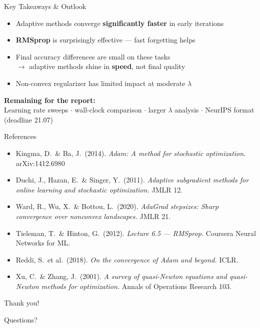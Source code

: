 \documentclass[aspectratio=169, 12pt]{beamer}
\begin{document}
\begin{frame}{Key Takeaways \& Outlook}
\begin{itemize}
  \setlength{\itemsep}{0.4cm}
  \item Adaptive methods converge \textbf{significantly faster} in early iterations
  \item \textbf{RMSprop} is surprisingly effective --- fast forgetting helps
  \item Final accuracy differences are small on these tasks\\
        $\to$ adaptive methods shine in \textbf{speed}, not final quality
  \item Non-convex regularizer has limited impact at moderate $\lambda$
\end{itemize}
\vskip0.3cm
\textbf{Remaining for the report:}\\
{\small Learning rate sweeps $\cdot$ wall-clock comparison $\cdot$ larger $\lambda$ analysis $\cdot$ NeurIPS format (deadline 21.07)}
\end{frame}

\begin{frame}{References}
\small
\begin{itemize}
  \setlength{\itemsep}{0.25cm}
  \item Kingma, D.\ \& Ba, J.\ (2014). \textit{Adam: A method for stochastic optimization.} arXiv:1412.6980
  \item Duchi, J., Hazan, E.\ \& Singer, Y.\ (2011). \textit{Adaptive subgradient methods for online learning and stochastic optimization.} JMLR 12.
  \item Ward, R., Wu, X.\ \& Bottou, L.\ (2020). \textit{AdaGrad stepsizes: Sharp convergence over nonconvex landscapes.} JMLR 21.
  \item Tieleman, T.\ \& Hinton, G.\ (2012). \textit{Lecture 6.5 --- RMSprop.} Coursera Neural Networks for ML.
  \item Reddi, S.\ et al.\ (2018). \textit{On the convergence of Adam and beyond.} ICLR.
  \item Xu, C.\ \& Zhang, J.\ (2001). \textit{A survey of quasi-Newton equations and quasi-Newton methods for optimization.} Annals of Operations Research 103.
\end{itemize}
\end{frame}

{
\begin{frame}[plain,c]
  \centering
  {\color{black}Thank you!\par}
  \vskip1cm
  {\large Questions?\par}
\end{frame}
}
\end{document}
